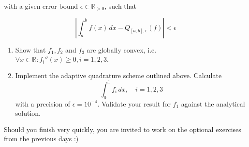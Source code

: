     with a given error bound $\epsilon \in \mathbb{R}_{>0}$, such that

    \begin{equation}
        \left| \int_{a}^{b} f(x) \, dx - Q_{[a,b],\epsilon}(f) \right| < \epsilon
    \end{equation}

    \begin{enumerate}
        \item Show that $f_1,f_2$ and $f_3$ are globally convex, i.e. $\forall x \in \mathbb{R}: f_i''(x) \geq 0, i=1,2,3$.
        \item Implement the adaptive quadrature scheme outlined above. Calculate
        \begin{equation}
            \int_{0}^{1} f_i \, dx, \quad i = 1,2,3
        \end{equation}
        with a precision of $\epsilon = 10^{-4}$. Validate your result for
        $f_1$ against the analytical solution.
    \end{enumerate}

    Should you finish very quickly, you are invited to work on the 
    optional exercises from the previous days :)


\pagebreak